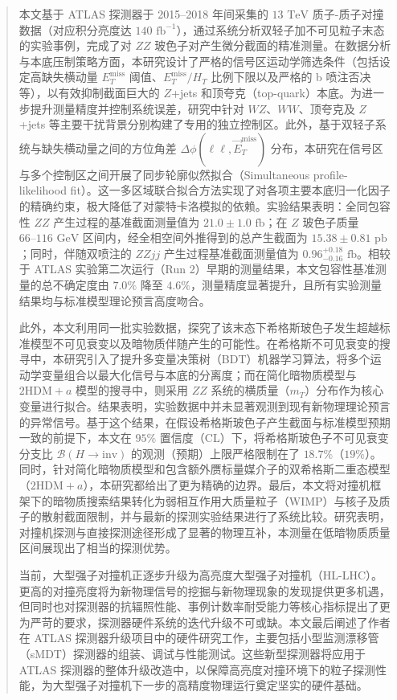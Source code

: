 \begin{abstract}
本文基于 ATLAS 探测器于 2015--2018 年间采集的 $13 \text{ TeV}$ 质子-质子对撞数据（对应积分亮度达 $140 \text{ fb}^{-1}$），通过系统分析双轻子加不可见粒子末态的实验事例，完成了对 $ZZ$ 玻色子对产生微分截面的精准测量。在数据分析与本底压制策略方面，本研究设计了严格的信号区运动学筛选条件（包括设定高缺失横动量 $E_{T}^{\text{miss}}$ 阈值、$E_{T}^{\text{miss}}/H_{T}$ 比例下限以及严格的 b 喷注否决等），以有效抑制截面巨大的 $Z$+jets 和顶夸克（top-quark）本底。为进一步提升测量精度并控制系统误差，研究中针对 $WZ$、$WW$、顶夸克及 $Z$+jets 等主要干扰背景分别构建了专用的独立控制区。此外，基于双轻子系统与缺失横动量之间的方位角差 $\Delta\phi(\ell\ell, \vec{E}_{T}^{\text{miss}})$ 分布，本研究在信号区与多个控制区之间开展了同步轮廓似然拟合（Simultaneous profile-likelihood fit）。这一多区域联合拟合方法实现了对各项主要本底归一化因子的精确约束，极大降低了对蒙特卡洛模拟的依赖。实验结果表明：全同包容性 $ZZ$ 产生过程的基准截面测量值为 $21.0 \pm 1.0 \text{ fb}$；在 $Z$ 玻色子质量 $66\text{--}116 \text{ GeV}$ 区间内，经全相空间外推得到的总产生截面为 $15.38 \pm 0.81 \text{ pb}$；同时，伴随双喷注的 $ZZjj$ 产生过程基准截面测量值为 $0.96^{+0.18}_{-0.16} \text{ fb}$。相较于 ATLAS 实验第二次运行（Run 2）早期的测量结果，本文包容性基准测量的总不确定度由 $7.0\%$ 降至 $4.6\%$，测量精度显著提升，且所有实验测量结果均与标准模型理论预言高度吻合。

此外，本文利用同一批实验数据，探究了该末态下希格斯玻色子发生超越标准模型不可见衰变以及暗物质伴随产生的可能性。在希格斯不可见衰变的搜寻中，本研究引入了提升多变量决策树（BDT）机器学习算法，将多个运动学变量组合以最大化信号与本底的分离度；而在简化暗物质模型与 $\text{2HDM}+a$ 模型的搜寻中，则采用 $ZZ$ 系统的横质量（$m_{T}$）分布作为核心变量进行拟合。结果表明，实验数据中并未显著观测到现有新物理理论预言的异常信号。基于这个结果，在假设希格斯玻色子产生截面与标准模型预期一致的前提下，本文在 $95\%$ 置信度（CL）下，将希格斯玻色子不可见衰变分支比 $\mathcal{B}(H \to \text{inv})$ 的观测（预期）上限严格限制在了 $18.7\%$（$19\%$）。同时，针对简化暗物质模型和包含额外赝标量媒介子的双希格斯二重态模型（$\text{2HDM}+a$），本研究都给出了更为精确的边界。最后，本文将对撞机框架下的暗物质搜索结果转化为弱相互作用大质量粒子（WIMP）与核子及质子的散射截面限制，并与最新的探测实验结果进行了系统比较。研究表明，对撞机探测与直接探测途径形成了显著的物理互补，本测量在低暗物质质量区间展现出了相当的探测优势。

当前，大型强子对撞机正逐步升级为高亮度大型强子对撞机（HL-LHC）。更高的对撞亮度将为新物理信号的挖掘与新物理现象的发现提供更多机遇，但同时也对探测器的抗辐照性能、事例计数率耐受能力等核心指标提出了更为严苛的要求，探测器硬件系统的迭代升级不可或缺。本文最后阐述了作者在 ATLAS 探测器升级项目中的硬件研究工作，主要包括小型监测漂移管（sMDT）探测器的组装、调试与性能测试。这些新型探测器将应用于 ATLAS 探测器的整体升级改造中，以保障高亮度对撞环境下的粒子探测性能，为大型强子对撞机下一步的高精度物理运行奠定坚实的硬件基础。

\end{abstract}

